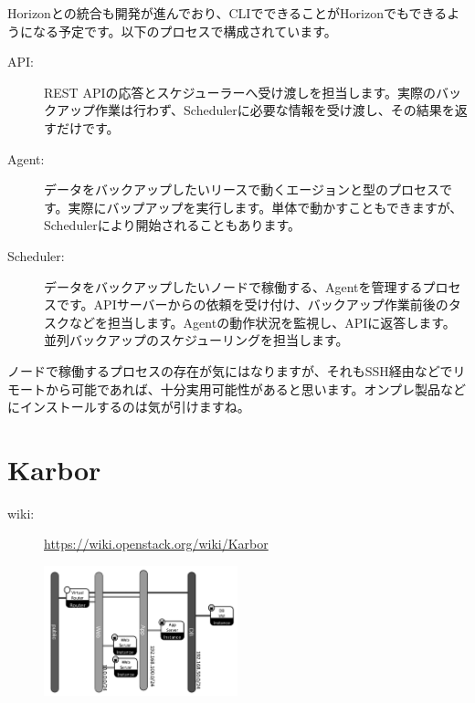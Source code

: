 Horizonとの統合も開発が進んでおり、CLIでできることがHorizonでもできるようになる予定です。以下のプロセスで構成されています。

\begin{description}
	\item[API:] REST APIの応答とスケジューラーへ受け渡しを担当します。実際のバックアップ作業は行わず、Schedulerに必要な情報を受け渡し、その結果を返すだけです。
	\item[Agent:] データをバックアップしたいリースで動くエージョンと型のプロセスです。実際にバップアップを実行します。単体で動かすこともできますが、Schedulerにより開始されることもあります。
	\item[Scheduler:] データをバックアップしたいノードで稼働する、Agentを管理するプロセスです。APIサーバーからの依頼を受け付け、バックアップ作業前後のタスクなどを担当します。Agentの動作状況を監視し、APIに返答します。並列バックアップのスケジューリングを担当します。
\end{description}

ノードで稼働するプロセスの存在が気にはなりますが、それもSSH経由などでリモートから可能であれば、十分実用可能性があると思います。オンプレ製品などにインストールするのは気が引けますね。

\section{Karbor}

\begin{description}
	\item[wiki:] \url{https://wiki.openstack.org/wiki/Karbor}
\end{description}

\begin{figure}
	\vspace*{-2\intextsep}
	\begin{center}
		\includegraphics[width=0.5\textwidth]{img/Smaug-sample-application.png}
	\end{center}
\end{figure}

